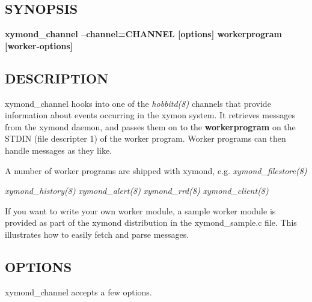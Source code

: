 \subsection{SYNOPSIS}
\textbf{xymond\_channel --channel=CHANNEL [options] workerprogram [worker-options]}


 
\subsection{DESCRIPTION}
 xymond\_channel hooks into one of the \emph{hobbitd(8)} channels
 that provide information about events occurring in the xymon
 system. It retrieves messages from the xymond daemon, and passes
 them on to the \textbf{workerprogram} on the STDIN (file descripter
 1) of the worker program. Worker programs can then handle messages as
 they like. 


  A number of worker programs are shipped with xymond,
  e.g. \emph{xymond\_filestore(8)}

 \emph{xymond\_history(8)}
 \emph{xymond\_alert(8)}
 \emph{xymond\_rrd(8)}
 \emph{xymond\_client(8)}



  If you want to write your own worker module, a sample worker module
  is provided as part of the xymond distribution in the
  xymond\_sample.c file. This illustrates how to easily fetch and
  parse messages. 



 
\subsection{OPTIONS}
 xymond\_channel accepts a few options. 

